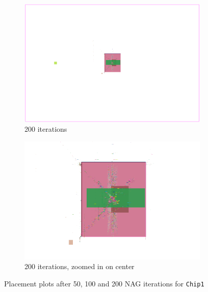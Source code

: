 \begin{figure}[p]
 \begin{subfigure}{.48\textwidth}
  \includegraphics[width=\textwidth]{epsilon/placement_Chip1_200_iterations.png}
  \caption{200 iterations}
 \end{subfigure}
 \hfill
 \begin{subfigure}{.48\textwidth}
  \includegraphics[width=\textwidth, frame]{epsilon/placement_Chip1_200_iterations_zoomed.png}
  \caption{200 iterations, zoomed in on center}
 \end{subfigure}

 \caption{Placement plots after 50, 100 and 200 NAG iterations for \texttt{Chip1}}
 \label{fig:placement_Chip1_depending_on_max_iterations}
\end{figure}

